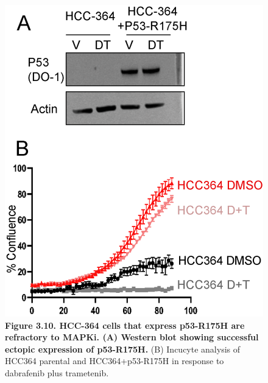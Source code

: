 \begin{figure}
\hypertarget{fig:3.10}{%
\centering
\includegraphics[width=1\textwidth,height=\textheight]{images/p538.png}
\caption{\textbf{Figure 3.10. HCC-364 cells that express p53-R175H are refractory to MAPKi. (A) Western blot showing successful ectopic expression of p53-R175H.} (B) Incucyte analysis of HCC364 parental and HCC364+p53-R175H in response to dabrafenib plus trametenib.}\label{fig:3.10}
}
\end{figure}

